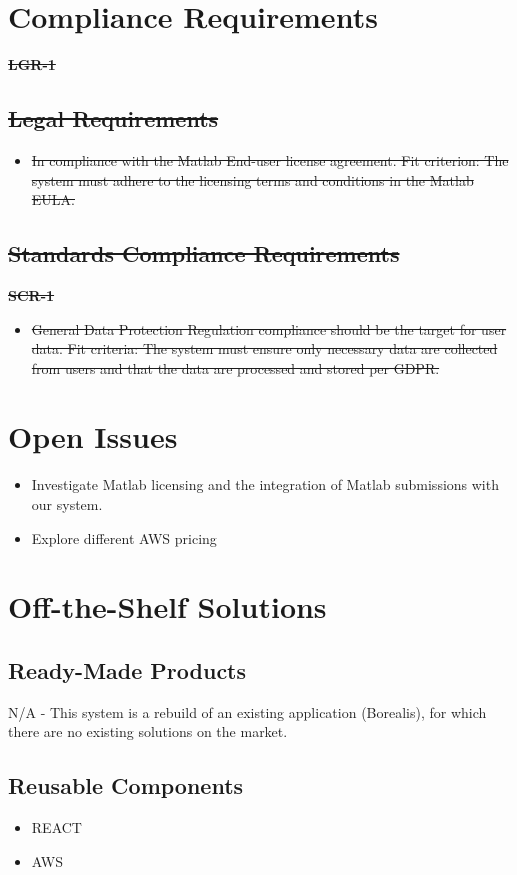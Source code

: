 \documentclass[12pt]{article}
\begin{document}
\section{Compliance Requirements}
\textbf{\sout{LGR-1}}
\subsection{\sout{Legal Requirements}}
\begin{itemize}
    \item \sout{In compliance with the Matlab End-user license agreement. \hfill \break
    Fit criterion: The system must adhere to the licensing terms and conditions in the Matlab EULA.}

\end{itemize}
\subsection{\sout{Standards Compliance Requirements}}
\textbf{\sout{SCR-1}}
\begin{itemize}
    \item \sout{General Data Protection Regulation compliance should be the target for user data. \hfill \break
    Fit criteria: The system must ensure only necessary data are collected from users and that the data are processed and stored per GDPR. }

\end{itemize}

\section{Open Issues}
\begin{itemize}
    \item Investigate Matlab licensing and the integration of Matlab submissions with our system.
    \item Explore different AWS pricing
\end{itemize}

\section{Off-the-Shelf Solutions}
\subsection{Ready-Made Products}
N/A - This system is a rebuild of an existing application (Borealis), for which there are no existing solutions on the market.
\subsection{Reusable Components}
\begin{itemize}
    \item REACT
    \item AWS
\end{itemize}
\end{document}
